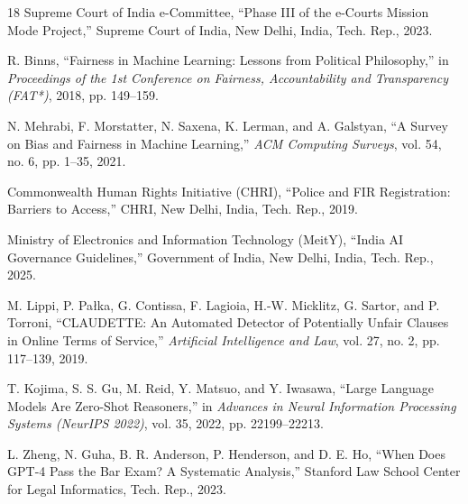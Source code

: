 \documentclass[conference]{IEEEtran}
\begin{document}
\begin{thebibliography}{18}
Supreme Court of India e-Committee, ``Phase III of the e-Courts Mission Mode Project,'' Supreme Court of India, New Delhi, India, Tech. Rep., 2023.

R. Binns, ``Fairness in Machine Learning: Lessons from Political Philosophy,'' in \emph{Proceedings of the 1st Conference on Fairness, Accountability and Transparency (FAT*)}, 2018, pp. 149--159.

N. Mehrabi, F. Morstatter, N. Saxena, K. Lerman, and A. Galstyan, ``A Survey on Bias and Fairness in Machine Learning,'' \emph{ACM Computing Surveys}, vol. 54, no. 6, pp. 1--35, 2021.

Commonwealth Human Rights Initiative (CHRI), ``Police and FIR Registration: Barriers to Access,'' CHRI, New Delhi, India, Tech. Rep., 2019.

Ministry of Electronics and Information Technology (MeitY), ``India AI Governance Guidelines,'' Government of India, New Delhi, India, Tech. Rep., 2025.

M. Lippi, P. Pa{\l}ka, G. Contissa, F. Lagioia, H.-W. Micklitz, G. Sartor, and P. Torroni, ``CLAUDETTE: An Automated Detector of Potentially Unfair Clauses in Online Terms of Service,'' \emph{Artificial Intelligence and Law}, vol. 27, no. 2, pp. 117--139, 2019.

T. Kojima, S. S. Gu, M. Reid, Y. Matsuo, and Y. Iwasawa, ``Large Language Models Are Zero-Shot Reasoners,'' in \emph{Advances in Neural Information Processing Systems (NeurIPS 2022)}, vol. 35, 2022, pp. 22199--22213.

L. Zheng, N. Guha, B. R. Anderson, P. Henderson, and D. E. Ho, ``When Does GPT-4 Pass the Bar Exam? A Systematic Analysis,'' Stanford Law School Center for Legal Informatics, Tech. Rep., 2023.

\end{thebibliography}
\end{document}
